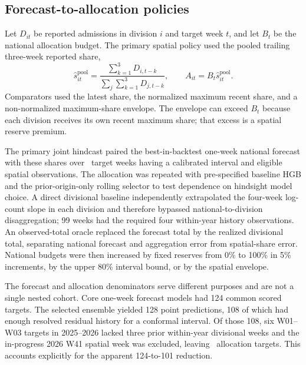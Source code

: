 \documentclass[11pt]{article}
\begin{document}
\subsection{Forecast-to-allocation policies}

Let $D_{it}$ be reported admissions in division $i$ and target week $t$, and let $B_t$ be the national allocation budget. The primary spatial policy used the pooled trailing three-week reported share,
\begin{equation}
\widehat{s}^{\mathrm{pool}}_{it}=
\frac{\sum_{k=1}^{3}D_{i,t-k}}
{\sum_j\sum_{k=1}^{3}D_{j,t-k}},
\qquad A_{it}=B_t\widehat{s}^{\mathrm{pool}}_{it}.
\end{equation}
Comparators used the latest share, the normalized maximum recent share, and a non-normalized maximum-share envelope. The envelope can exceed $B_t$ because each division receives its own recent maximum share; that excess is a spatial reserve premium.

The primary joint hindcast paired the best-in-backtest one-week national forecast with these shares over \JointWeeks\ target weeks having a calibrated interval and eligible spatial observations. The allocation was repeated with pre-specified baseline HGB and the prior-origin-only rolling selector to test dependence on hindsight model choice. A direct divisional baseline independently extrapolated the four-week log-count slope in each division and therefore bypassed national-to-division disaggregation; 99 weeks had the required four within-year history observations. An observed-total oracle replaced the forecast total by the realized divisional total, separating national forecast and aggregation error from spatial-share error. National budgets were then increased by fixed reserves from 0\% to 100\% in 5\% increments, by the upper 80\% interval bound, or by the spatial envelope.

The forecast and allocation denominators serve different purposes and are not a single nested cohort. Core one-week forecast models had 124 common scored targets. The selected ensemble yielded 128 point predictions, 108 of which had enough resolved residual history for a conformal interval. Of those 108, six W01--W03 targets in 2025--2026 lacked three prior within-year divisional weeks and the in-progress 2026 W41 spatial week was excluded, leaving \JointWeeks\ allocation targets. This accounts explicitly for the apparent 124-to-101 reduction.
\end{document}
